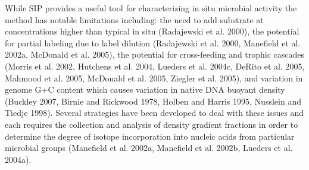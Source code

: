 While SIP provides a useful tool for characterizing in situ microbial activity the method has notable limitations including: the need to add substrate at concentrations higher than typical in situ (Radajewski et al. 2000), the potential for partial labeling due to label dilution (Radajewski et al. 2000, Manefield et al. 2002a, McDonald et al. 2005), the potential for cross-feeding and trophic cascades (Morris et al. 2002, Hutchens et al. 2004, Lueders et al. 2004c, DeRito et al. 2005, Mahmood et al. 2005, McDonald et al. 2005, Ziegler et al. 2005), and variation in genome G+C content which causes variation in native DNA buoyant density (Buckley 2007, Birnie and Rickwood 1978, Holben and Harris 1995, Nusslein and Tiedje 1998). Several strategies have been developed to deal with these issues and each requires the collection and analysis of density gradient fractions in order to determine the degree of isotope incorporation into nucleic acids from particular microbial groups (Manefield et al. 2002a, Manefield et al. 2002b, Lueders et al. 2004a).

